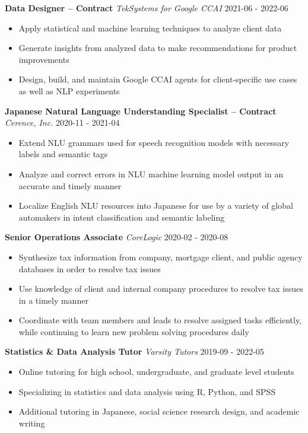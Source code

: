 \documentclass[a4paper,9pt]{extarticle}
\begin{document}
\noindent
\textbf{Data Designer -- Contract}
\noindent
\textit{TekSystems for Google CCAI} \hfill 2021-06 - 2022-06
\begin{itemize}

\item Apply statistical and machine learning techniques to analyze client data
\item Generate insights from analyzed data to make recommendations for product improvements
\item Design, build, and maintain Google CCAI agents for client-specific use cases as well as NLP experiments
\end{itemize}

\noindent
\textbf{Japanese Natural Language Understanding Specialist -- Contract}
\noindent
\textit{Cerence, Inc.} \hfill 2020-11 - 2021-04
\begin{itemize}

\item Extend NLU grammars used for speech recognition models with necessary labels and semantic tags
\item Analyze and correct errors in NLU machine learning model output in an accurate and timely manner
\item Localize English NLU resources into Japanese for use by a variety of global automakers in intent classification and semantic labeling
\end{itemize}

\noindent
\textbf{Senior Operations Associate}
\noindent
\textit{CoreLogic} \hfill 2020-02 - 2020-08
\begin{itemize}

\item Synthesize tax information from company, mortgage client, and public agency databases in order to resolve tax issues
\item Use knowledge of client and internal company procedures to resolve tax issues in a timely manner
\item Coordinate with team members and leads to resolve assigned tasks efficiently, while continuing to learn new problem solving procedures daily
\end{itemize}

\noindent
\textbf{Statistics \& Data Analysis Tutor}
\noindent
\textit{Varsity Tutors} \hfill 2019-09 - 2022-05
\begin{itemize}

\item Online tutoring for high school, undergraduate, and graduate level students
\item Specializing in statistics and data analysis using R, Python, and SPSS
\item Additional tutoring in Japanese, social science research design, and academic writing
\end{itemize}
\end{document}
